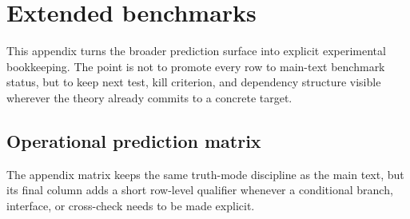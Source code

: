 \section{Extended benchmarks}
\label{app:benchmarks}

This appendix turns the broader prediction surface into explicit experimental bookkeeping. The point is not to promote every row to main-text benchmark status, but to keep next test, kill criterion, and dependency structure visible wherever the theory already commits to a concrete target.

\subsection{Operational prediction matrix}

The appendix matrix keeps the same truth-mode discipline as the main text, but its final column adds a short row-level qualifier whenever a conditional branch, interface, or cross-check needs to be made explicit.

